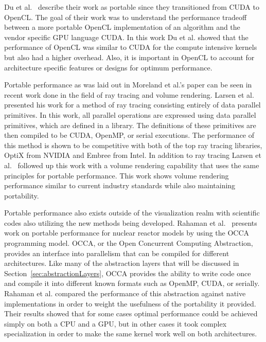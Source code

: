 Du et al.~\cite{du2012cuda} describe their work as portable since they transitioned from CUDA to OpenCL.
%
The goal of their work was to understand the performance tradeoff between a more portable OpenCL implementation of an algorithm and the vendor specific GPU language CUDA.
%
In this work Du et al. showed that the performance of OpenCL was similar to CUDA for the compute intensive kernels but also had a higher overhead.
%
Also, it is important in OpenCL to account for architecture specific features or designs for optimum performance.
%

Portable performance as was laid out in Moreland et al.'s paper can be seen in recent work done in the field of ray tracing and volume rendering.
%
Larsen et al.~\cite{larsen2015ray} presented his work for a method of ray tracing consisting entirely of data parallel primitives.
%
In this work, all parallel operations are expressed using data parallel primitives, which are defined in a library.
%
The definitions of these primitives are then compiled to be CUDA, OpenMP, or serial executions.
%
The performance of this method is shown to be competitive with both of the top ray tracing libraries, OptiX from NVIDIA and Embree from Intel. 
%
In addition to ray tracing Larsen et al.~\cite{larsen2015volume} followed up this work with a volume rendering capability that uses the same principles for portable performance.
%
This work shows volume rendering performance similar to current industry standards while also maintaining portability.

Portable performance also exists outside of the visualization realm with scientific codes also utilizing the new methods being developed.
%
Rahaman et al.~\cite{rahaman2015portability} presents work on portable performance for nuclear reactor models by using the OCCA programming model.
%
OCCA, or the Open Concurrent Computing Abstraction, provides an interface into parallelism that can be compiled for different architectures.
%
Like many of the abstraction layers that will be discussed in Section~\ref{sec:abstractionLayers}, OCCA provides the ability to write code once and compile it into different known formats such as OpenMP, CUDA, or serially.
%
Rahaman et al. compared the performance of this abstraction against native implementations in order to weight the usefulness of the portability it provided.
%
Their results showed that for some cases optimal performance could be achieved simply on both a CPU and a GPU, but in other cases it took complex specialization in order to make the same kernel work well on both architectures.

